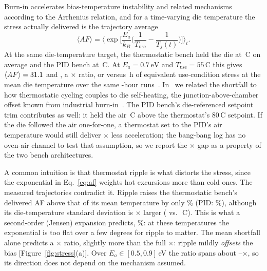 \documentclass[10pt,twocolumn]{article}
\newcommand{\degC}{\,\textdegree C}
\newcommand{\unit}[1]{\,\mathrm{#1}}
\begin{document}
Burn-in accelerates bias-temperature instability and related mechanisms according to the Arrhenius relation, and for a time-varying die temperature the stress actually delivered is the trajectory average
\begin{equation}
\langle AF\rangle=\Big\langle \exp\!\Big[\frac{E_a}{k_B}\Big(\frac{1}{T_{\mathrm{use}}}-\frac{1}{T_j(t)}\Big)\Big]\Big\rangle_t .
\label{eq:af}
\end{equation}
At the same die-temperature target, the thermostatic bench held the die at \vTBB\degC{} on average and the PID bench at \vTPID\degC. At $E_a=0.7\unit{eV}$ and $T_{\mathrm{use}}=55$\degC{} this gives $\langle AF\rangle=31.1$ and \vAFPID, a \vAFratio$\times$ ratio, or \vEqhBB{} versus \vEqhPID\,h of equivalent use-condition stress at the mean die temperature over the same \vDurPair-hour runs~\cite{sbcci26}. In~\cite{sbcci26} we related the shortfall to how thermostatic cycling couples to die self-heating, the junction-above-chamber offset known from industrial burn-in~\cite{vassighi,semenov}. The PID bench's die-referenced setpoint trim contributes as well: it held the air \vSPoffset\degC{} above the thermostat's 80\degC{} setpoint. If the die followed the air one-for-one, a thermostat set to the PID's air temperature would still deliver \vAFratioSPadj$\times$ less acceleration; the bang-bang log has no oven-air channel to test that assumption, so we report the \vAFratio$\times$ gap as a property of the two bench architectures.

A common intuition is that thermostat ripple is what distorts the stress, since the exponential in Eq.~\eqref{eq:af} weights hot excursions more than cold ones. The measured trajectories contradict it. Ripple raises the thermostatic bench's delivered AF above that of its mean temperature by only \vRippleBB\% (PID: \vRipplePID\%), although its die-temperature standard deviation is \vTsdRatio$\times$ larger (\vTsdBB{} vs.\ \vTsdPID\degC). This is what a second-order (Jensen) expansion predicts, \vJensen\%: at these temperatures the exponential is too flat over a few degrees for ripple to matter. The mean shortfall alone predicts a \vAFratioMeanOnly$\times$ ratio, slightly more than the full \vAFratio$\times$: ripple mildly \emph{offsets} the bias [Figure~\ref{fig:stress}(a)]. Over $E_a\in[0.5,0.9]$\,eV the ratio spans about \vAFratioLoOne--\vAFratioHiOne$\times$, so its direction does not depend on the mechanism assumed.
\end{document}
